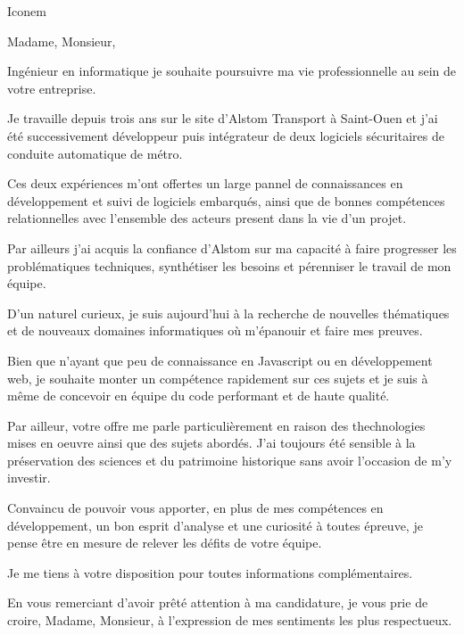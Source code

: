 \documentclass[12pt]{lettre}
\makeatletter
\newcommand*{\NoRule}{\renewcommand*{\rule@length}{0}}
\makeatother
\begin{document}
\begin{letter}{Iconem}

  \def\concname{Objet :~}


  \signature{Hoel IRIS}
  \address{Hoel IRIS\\
  54 avenue Mathurin Moreau\\
  75019 Paris\\
  Tel : 06 18 39 30 11\\
  E-Mail : hoel.iris@gmail.com}
  \NoRule
  \notelephone
  \nofax
    \opening{Madame, Monsieur,}


    Ingénieur en informatique je souhaite poursuivre ma vie professionnelle au sein de votre entreprise.

    Je travaille depuis trois ans sur le site d'Alstom Transport à Saint-Ouen et j'ai été successivement développeur puis intégrateur de deux logiciels sécuritaires de conduite automatique de métro.

    Ces deux expériences m'ont offertes un large pannel de connaissances en développement et suivi de logiciels embarqués, ainsi que de bonnes compétences relationnelles avec l'ensemble des acteurs present dans la vie d'un projet. 

    Par ailleurs j'ai acquis la confiance d'Alstom sur ma capacité à faire progresser les problématiques techniques, synthétiser les besoins et pérenniser le travail de mon équipe.

    D'un naturel curieux, je suis aujourd'hui à la recherche de nouvelles thématiques et de nouveaux domaines informatiques où m'épanouir et faire mes preuves.
    
    Bien que n'ayant que peu de connaissance en Javascript ou en développement web, je souhaite monter un compétence rapidement sur ces sujets et je suis à même de concevoir en équipe du code performant et de haute qualité. 
    
    Par ailleur, votre offre me parle particulièrement en raison des thechnologies mises en oeuvre ainsi que des sujets abordés. J'ai toujours été sensible à la préservation des sciences et du patrimoine historique sans avoir l'occasion de m'y investir.
    
    Convaincu de pouvoir vous apporter, en plus de mes compétences en développement, un bon esprit d'analyse et une curiosité à toutes épreuve, je pense être en mesure de relever les défits de votre équipe.

    Je me tiens à votre disposition pour toutes informations complémentaires.
 
   
    \closing{En vous remerciant d’avoir prêté attention à ma candidature, je vous prie de croire, Madame, Monsieur, à l’expression de mes sentiments les plus respectueux.}
    
 
\end{letter}
 
\end{document}
